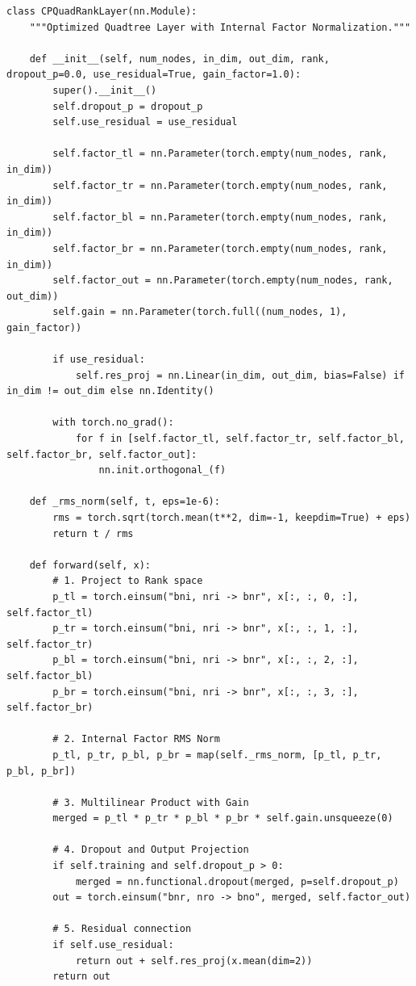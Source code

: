 \documentclass[12pt, a4paper, oneside]{report}
\begin{document}
\begin{verbatim}
class CPQuadRankLayer(nn.Module):
    """Optimized Quadtree Layer with Internal Factor Normalization."""

    def __init__(self, num_nodes, in_dim, out_dim, rank, dropout_p=0.0, use_residual=True, gain_factor=1.0):
        super().__init__()
        self.dropout_p = dropout_p
        self.use_residual = use_residual

        self.factor_tl = nn.Parameter(torch.empty(num_nodes, rank, in_dim))
        self.factor_tr = nn.Parameter(torch.empty(num_nodes, rank, in_dim))
        self.factor_bl = nn.Parameter(torch.empty(num_nodes, rank, in_dim))
        self.factor_br = nn.Parameter(torch.empty(num_nodes, rank, in_dim))
        self.factor_out = nn.Parameter(torch.empty(num_nodes, rank, out_dim))
        self.gain = nn.Parameter(torch.full((num_nodes, 1), gain_factor))

        if use_residual:
            self.res_proj = nn.Linear(in_dim, out_dim, bias=False) if in_dim != out_dim else nn.Identity()

        with torch.no_grad():
            for f in [self.factor_tl, self.factor_tr, self.factor_bl, self.factor_br, self.factor_out]:
                nn.init.orthogonal_(f)

    def _rms_norm(self, t, eps=1e-6):
        rms = torch.sqrt(torch.mean(t**2, dim=-1, keepdim=True) + eps)
        return t / rms

    def forward(self, x):
        # 1. Project to Rank space
        p_tl = torch.einsum("bni, nri -> bnr", x[:, :, 0, :], self.factor_tl)
        p_tr = torch.einsum("bni, nri -> bnr", x[:, :, 1, :], self.factor_tr)
        p_bl = torch.einsum("bni, nri -> bnr", x[:, :, 2, :], self.factor_bl)
        p_br = torch.einsum("bni, nri -> bnr", x[:, :, 3, :], self.factor_br)

        # 2. Internal Factor RMS Norm
        p_tl, p_tr, p_bl, p_br = map(self._rms_norm, [p_tl, p_tr, p_bl, p_br])

        # 3. Multilinear Product with Gain
        merged = p_tl * p_tr * p_bl * p_br * self.gain.unsqueeze(0)

        # 4. Dropout and Output Projection
        if self.training and self.dropout_p > 0:
            merged = nn.functional.dropout(merged, p=self.dropout_p)
        out = torch.einsum("bnr, nro -> bno", merged, self.factor_out)

        # 5. Residual connection
        if self.use_residual:
            return out + self.res_proj(x.mean(dim=2))
        return out
\end{verbatim}
\end{document}
